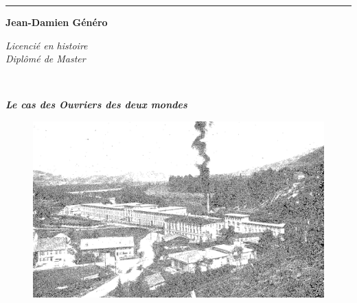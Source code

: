 \begin{titlepage}
\begin{center}

\bigskip

\begin{large}
\end{large}
\begin{center}\rule{2cm}{0.02cm}\end{center}

\bigskip
\bigskip
\begin{Large}
\textbf{Jean-Damien Généro}\\
\end{Large}
\begin{normalsize} \textit{Licencié en histoire}\\
\textit{Diplômé de Master}\\
\end{normalsize}

\bigskip
\bigskip

\begin{Huge}
\textbf{}\\
\end{Huge}
\bigskip
\bigskip
\begin{LARGE}
\textbf{\emph{Le cas des Ouvriers des deux mondes} }\\
\end{LARGE}

\bigskip

\begin{figure}[h]
    \centering
    \includegraphics[width=12cm]{img/couv.png}
    \label{fig:ill_couv}
\end{figure}

\begin{large}
\end{large}
\vfill


\end{center}
\end{titlepage}
